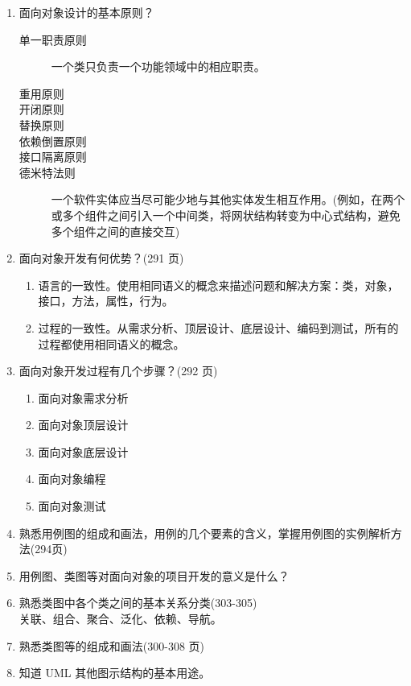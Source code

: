 \documentclass[14pt, letterpaper, UTF8, fontset=windowsnew, heading=true]{article}
\begin{document}
\begin{enumerate}
	\item 面向对象设计的基本原则？
	\begin{description}
		\item[单一职责原则] 一个类只负责一个功能领域中的相应职责。
		\item[重用原则] 
		\item[开闭原则] 
		\item[替换原则] 
		\item[依赖倒置原则] 
		\item[接口隔离原则] 
		\item[德米特法则] 一个软件实体应当尽可能少地与其他实体发生相互作用。(例如，在两个或多个组件之间引入一个中间类，将网状结构转变为中心式结构，避免多个组件之间的直接交互)
	\end{description}
	
	\item 面向对象开发有何优势？(291 页)
	\begin{enumerate}
		\item 语言的一致性。使用相同语义的概念来描述问题和解决方案：类，对象，接口，方法，属性，行为。
		\item 过程的一致性。从需求分析、顶层设计、底层设计、编码到测试，所有的过程都使用相同语义的概念。
	\end{enumerate}
	
	\item 面向对象开发过程有几个步骤？(292 页)
	\begin{enumerate}
		\item 面向对象需求分析
		\item 面向对象顶层设计
		\item 面向对象底层设计
		\item 面向对象编程
		\item 面向对象测试
	\end{enumerate}
	
	\item 熟悉用例图的组成和画法，用例的几个要素的含义，掌握用例图的实例解析方法(294页)
	
	\item 用例图、类图等对面向对象的项目开发的意义是什么？
	
	\item 熟悉类图中各个类之间的基本关系分类(303-305) \\
	关联、组合、聚合、泛化、依赖、导航。
	
	\item 熟悉类图等的组成和画法(300-308 页)
	
	\item 知道 UML 其他图示结构的基本用途。
	
\end{enumerate}
\end{document}
